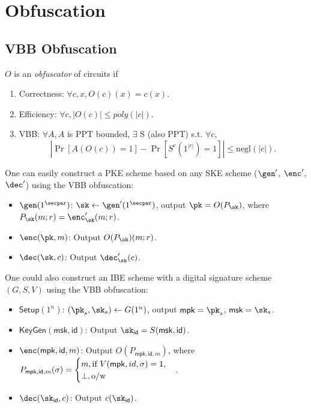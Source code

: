 \newcommand{\cO}{\ensuremath{\mathcal{O}}}
\newcommand{\Ck}{\mathcal{C}_{\kappa}}


\chapter{Obfuscation}
\section{VBB Obfuscation}
\begin{definition}
	$O$ is an \emph{obfuscator} of circuits if %
	\begin{enumerate}
		\item
			Correctness:
	$\forall c, x, O(c)(x) = c(x)$.
	\item
		Efficiency:
		$\forall c, |O(c)| \le poly(|c|)$.
	\item
		VBB:
		$\forall A, A$ is PPT bounded, $\exists$ S (also PPT) s.t. $\forall c$,
		\[
			|\Pr\left[ A\left( O(c) \right) = 1\right] - \Pr\left[ S^c(1^{|c|}) = 1 \right]| \le \mathrm{negl}(|c|).
		\]
	\end{enumerate}
\end{definition}

One can easily construct a PKE scheme based on any SKE scheme ($\gen'$, $\enc'$, $\dec'$) using the VBB obfuscation:
\begin{itemize}
    \item $\gen(1^\secpar)$: $\sk \gets \gen'(1^\secpar)$, output $\pk = O(P_\sk)$, where $P_\sk(m; r) = \enc'_{\sk}(m; r)$.
    \item $\enc(\pk, m)$: Output $O(P_\sk)(m; r)$.
    \item $\dec(\sk, c)$: Output $\dec'_\sk(c)$.
\end{itemize}

\newcommand{\SETUP}{\ensuremath{\mathsf{Setup}}}
\newcommand{\KEYGEN}{\ensuremath{\mathsf{KeyGen}}}
\newcommand{\mpk}{\ensuremath{\mathsf{mpk}}}
\newcommand{\msk}{\ensuremath{\mathsf{msk}}}
\newcommand{\id}{\ensuremath{\mathsf{id}}}

One could also construct an IBE scheme with a digital
signature scheme $(G, S, V)$ using the VBB obfuscation:
\begin{itemize}
\item $\SETUP(1^n)$: $(\pk_s,\sk_s)\gets G(1^n)$, output $\mpk = \pk_s$, $\msk = \sk_s$.
\item $\KEYGEN(\msk,\id)$: Output $\sk_{\id} = S(\msk, \id)$.
\item $\enc(\mpk, \id, m)$: Output $O(P_{\mpk,\id,m})$, where $P_{\mpk,\id,m}(\sigma) = \begin{cases}
	m, \hbox{if } V(\mpk, id, \sigma) = 1, \\
	\bot, \hbox{o/w}
    \end{cases}$.
\item $\dec(\sk_{\id}, c)$: Output $c(\sk_{\id})$.
\end{itemize}

